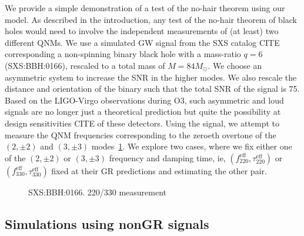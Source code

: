 \documentclass[twocolumn,prd,superscriptaddress,amsfonts,amssymb,amsmath,preprintnumbers]{revtex4-1}
\newcommand{\abhi}[1]{\textcolor{red}{[\textit{AG: #1}]}}
\newcommand{\Mo}{M_{\odot}}
\begin{document}
We provide a simple demonstration of a test of the no-hair theorem using our model. As described in the introduction, any test of the no-hair theorem of black holes would need to involve the independent measurements of (at least) two different QNMs. We use a simulated GW signal from the SXS catalog CITE corresponding a non-spinning binary black hole with a mass-ratio $q=6$ (SXS:BBH:0166), rescaled to a total mass of $M=84 \Mo$. We choose an asymmetric system to increase the SNR in the higher modes. We also rescale the distance and orientation of the binary such that the total SNR of the signal is 75. Based on the LIGO-Virgo observations during  O3, such asymmetric and loud signals are no longer just a theoretical prediction but quite the possibility at design sensitivities CITE of these detectors. Using the signal, we attempt to measure the QNM frequencies corresponding to the zeroeth overtone of the $(2,\pm 2)$ and $(3,\pm 3)$ modes~\ref{fig:nohair_sxs}. We explore two cases, where we fix either one of the $(2,\pm 2)$ or $(3,\pm 3)$ frequency and damping time, ie, $(f_{220}^{\text{eff}}, \tau _{220}^{\text{eff}})$ or $(f_{330}^{\text{eff}}, \tau _{330}^{\text{eff}})$ fixed at their GR predictions and estimating the other pair.

\begin{figure}
	\label{fig:nohair_sxs}
	\caption{SXS:BBH:0166. 220/330 measurement}
\end{figure}

\subsection{Simulations using nonGR signals}
\end{document}
